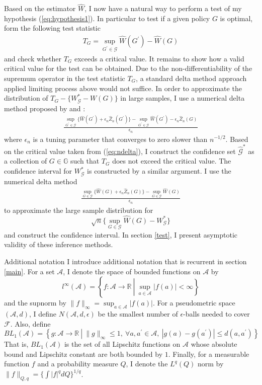 \documentclass[12pt,oneside,reqno,english]{amsart}
\makeatletter
\renewcommand\subsection{\@startsection{subsection}{2}%
  \z@{-.5\linespacing\@plus-.7\linespacing}{.5\linespacing}%
  {\normalfont\scshape}}
\theoremstyle{definition}
\makeatother
\begin{document}
Based on the estimator $\hat{W}$, I now have a natural way to perform a test of my hypothesis (\ref{eq:hypothesis1}). In particular to test if a given policy $G$ is optimal, form the following test statistic 
\begin{align}
T_{G}=\sup_{G^{\prime}\in \mathcal{G}}\hat{W}(G^{\prime})-\hat{W}(G)\label{eq:teststat}
\end{align}
and check whether $T_{G}$ exceeds a critical value. 
It remains to show how a valid critical value for the test can be obtained. Due to the non-differentiability of the 
supremum operator in the test statistic $T_{G}$, a standard delta method approach applied limiting process above would not suffice. 
In order to approximate the distribution of $T_{G}-\{W^{*}_{\mathcal{G}}-W(G)\}$ in large samples, I use a numerical delta method proposed by \cite{Dumbgen:93} and \cite{HL:18}:
\begin{align}
\frac{\sup_{G^{\prime}\in \mathcal{G}}\{\hat{W}(G^{\prime})+\epsilon_{n}\hat{Z}_{n}(G^{\prime})\}-\sup_{G^{\prime}\in \mathcal{G}}\hat{W}(G^{\prime})
-\epsilon_{n}\hat{Z}_{n}(G)}{\epsilon_{n}}\label{eq:ndelta}
\end{align}
where $\epsilon_{n}$ is a tuning parameter that converges to zero slower than $n^{-1/2}$. 
Based on the critical value taken from (\ref{eq:ndelta}), I construct the confidence set $\hat{\mathcal{G}}^{*}$ as a collection of $G\in \mathbb{G}$ 
such that $T_{G}$ does not exceed the critical value. The confidence interval for $W^{*}_{\mathcal{G}}$ is constructed by a similar argument. 
I use the numerical delta method  
\begin{align}
\frac{\sup_{G\in \mathcal{G}}\{\hat{W}(G)+\epsilon_{n}\hat{Z}_{n}(G)\}-\sup_{G\in \mathcal{G}}\hat{W}(G)
}{\epsilon_{n}}
\end{align}
to approximate the large sample distribution for 
\[\sqrt{n}\{\sup_{G\in \mathcal{G}}\hat{W}(G)-W^{*}_{\mathcal{G}}\}\]
and construct the confidence interval. 
In section \ref{test}, I present asymptotic validity of these inference methods.

\subsection{Additional notation}
I introduce additional notation that is recurrent in section \ref{main}. For a set $\mathcal{A}$, I denote the
space of bounded functions on $\mathcal{A}$ by
\[l^{\infty}(\mathcal{A})=\left\{f:\mathcal{A}\rightarrow \mathbb{R}\ \left| \ \sup_{a\in \mathcal{A}}|f(a)|<\infty\right\}\right.\]
and the supnorm by $\|f\|_{\infty}=\sup_{a\in \mathcal{A}}|f(a)|$.  
For a pseudometric space $(\mathcal{A},d)$, I define 
$N(\mathcal{A},d,\epsilon)$ be the smallest number of $\epsilon$-balls needed to cover $\mathcal{F}$. 
Also, define
\[BL_{1}(\mathcal{A})=\left\{ g:\mathcal{A}\rightarrow \mathbb{R} \ \left| \ \|g\|_{\infty}\leq 1,\ 
\forall a, a^{\prime}\in \mathcal{A}, \ |g(a)-g(a^{\prime})|\leq d(a,a^{\prime})\right\}\right.\]
That is, $BL_{1}(\mathcal{A})$ is the set of all Lipschitz functions on $\mathcal{A}$ whose absolute bound and Lipschitz
constant are both bounded by $1$.
Finally, for a measurable function $f$ and a probability measure $Q$,  I denote the $L^{q}(Q)$ norm by
$\|f\|_{Q,q}=\{\int |f|^{q}dQ\}^{1/q}$.  
\end{document}
